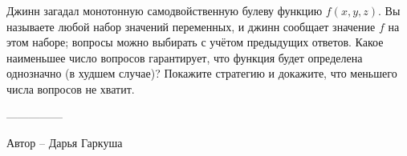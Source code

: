 \question
Джинн загадал монотонную самодвойственную булеву функцию $f(x,y,z)$. Вы называете любой набор значений переменных, и джинн сообщает значение $f$ на этом наборе; вопросы можно выбирать с учётом предыдущих ответов. Какое наименьшее число вопросов гарантирует, что функция будет определена однозначно (в худшем случае)? Покажите стратегию и докажите, что меньшего числа вопросов не хватит.

---------------

Автор -- Дарья Гаркуша